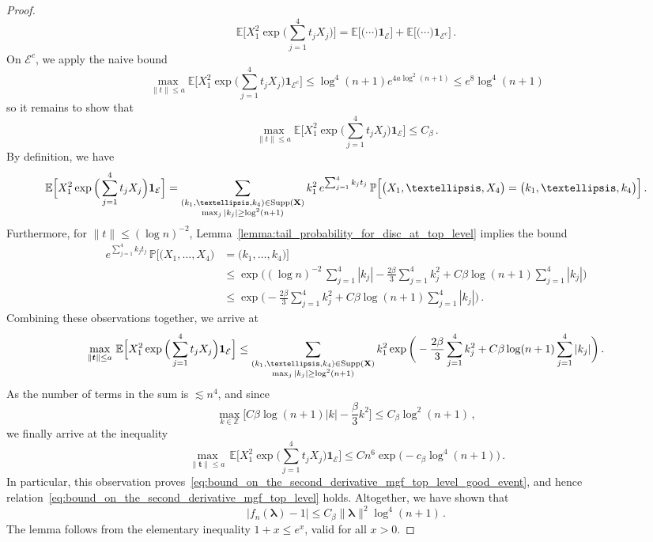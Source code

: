 \documentclass[11pt]{amsart}
\theoremstyle{definition}
\theoremstyle{remark}
\numberwithin{equation}{section}
\def\la{{\lambda}}
\newcommand{\bZ}{\mathbb Z}
\newcommand{\bP}{\mathbb P}
\newcommand{\bE}{\mathbb E}
\begin{document}
\begin{proof}
\begin{equation*}
			\bE\Big[X_1^2 \exp\Big(\sum_{j=1}^{4}t_j X_j\Big)\Big] = \bE\Big[\big(\cdots\big) \mathbf{1}_{\mathcal{E}}\Big] + \bE\Big[\big(\cdots\big) \mathbf{1}_{\mathcal{E}^c}\Big] \, .
		\end{equation*}
		On $\mathcal{E}^c$, we apply the naive bound
		\[
		\max_{\|t\|\le a}\bE\Big[X_1^2 \exp\Big(\sum_{j=1}^{4}t_j X_j\Big)\mathbf{1}_{\mathcal{E}^c}\Big] \le \log^4(n+1) e^{4 a \log^2(n+1) } \le e^8\log^4(n+1)
		\]
		so it remains to show that
		\begin{equation}
			\label{eq:bound_on_the_second_derivative_mgf_top_level_good_event}
			\max_{\|t\|\le a}\bE\Big[X_1^2 \exp\Big(\sum_{j=1}^{4}t_j X_j\Big)\mathbf{1}_{\mathcal{E}}\Big] \le C_\beta \, .
		\end{equation}
		By definition, we have
		\begin{equation*}
			\bE\Big[X_1^2 \exp\Big(\sum_{j=1}^{4}t_j X_j\Big)\mathbf{1}_{\mathcal{E}}\Big] = \sum_{\substack{(k_1,\ldots,k_4)\in \text{Supp}(\bf{X}) \\ \max_{j}|k_j|\ge \log^2(n+1)}} k_1^2  \, e^{\sum_{j=1}^{4} k_j t_j} \, \bP\Big[\big(X_1,\ldots,X_4\big) = \big(k_1,\ldots,k_4\big)\Big] \, .
		\end{equation*}
		Furthermore, for $\|t\| \le (\log n)^{-2}$, Lemma~\ref{lemma:tail_probability_for_disc_at_top_level} implies the bound
		\begin{align*}
			e^{\sum_{j=1}^{4} k_j t_j} \, \bP\Big[\big(X_1,\ldots,X_4\big) &= \big(k_1,\ldots,k_4\big)\Big] \\ & \le \exp\bigg((\log n)^{-2} \, \sum_{j=1}^{4} |k_j|-\frac{2\beta}{3}\sum_{j=1}^{4} k_j^2 + C\beta \log(n+1) \sum_{j=1}^4 |k_j|\bigg) \\ &\le \exp\bigg(-\frac{2\beta}{3}\sum_{j=1}^{4} k_j^2 + C\beta \log(n+1) \sum_{j=1}^4 |k_j|\bigg) \, .
		\end{align*}
		Combining these observations together, we arrive at
		\begin{equation*}
			\max_{\|\boldsymbol{t}\|\le a} \,\bE\Big[X_1^2 \exp\Big(\sum_{j=1}^{4}t_j X_j\Big)\mathbf{1}_{\mathcal{E}}\Big] \le \sum_{\substack{(k_1,\ldots,k_4)\in \text{Supp}(\bf{X}) \\ \max_{j}|k_j|\ge \log^2(n+1)}} k_1^2 \exp\bigg(-\frac{2\beta}{3}\sum_{j=1}^{4} k_j^2 + C\beta \log(n+1) \sum_{j=1}^4 |k_j|\bigg) \, .
		\end{equation*}
		As the number of terms in the sum is $\lesssim n^4$, and since
		\[
		\max_{k\in \bZ} \Big[C \beta \log(n+1) |k| - \frac{\beta}{3}k^2 \Big] \le C_\beta \log^2(n+1)\, ,
		\]
		we finally arrive at the inequality 
		\[
		\max_{\|\boldsymbol{t}\|\le a} \,\bE\Big[X_1^2 \exp\Big(\sum_{j=1}^{4}t_j X_j\Big)\mathbf{1}_{\mathcal{E}}\Big] \le Cn^6 \exp\Big(-c_\beta \log^4(n+1)\Big)\, .
		\]
		In particular, this observation proves~\eqref{eq:bound_on_the_second_derivative_mgf_top_level_good_event}, and hence relation~\eqref{eq:bound_on_the_second_derivative_mgf_top_level} holds. Altogether, we have shown that
		\[
		\big|f_n(\boldsymbol{\la}) - 1\big|\le  C_\beta  \|\boldsymbol{\la}\|^2 \log^4(n+1) \, .
		\]
		The lemma follows from the elementary inequality $1+x\le e^x$, valid for all $x>0$.
	\end{proof}
\end{document}
